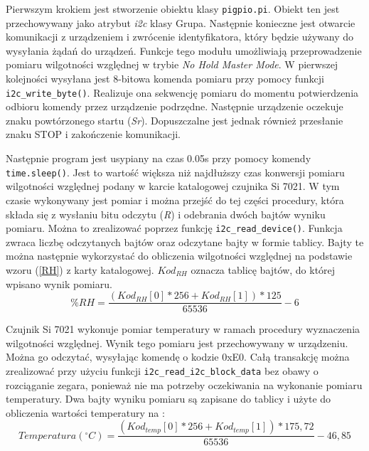 \documentclass[a4paper,11pt,twoside]{article}
\begin{document}
Pierwszym krokiem jest stworzenie obiektu klasy \texttt{pigpio.pi}. Obiekt ten jest przechowywany jako atrybut \textit{i2c} klasy Grupa. Następnie konieczne jest otwarcie komunikacji z urządzeniem i zwrócenie identyfikatora, który będzie używany do wysyłania żądań do urządzeń. Funkcje tego modułu umożliwiają przeprowadzenie pomiaru wilgotności względnej w trybie \textit{No Hold Master Mode}. W pierwszej kolejności wysyłana jest 8-bitowa komenda pomiaru przy pomocy funkcji \texttt{i2c{\_}write{\_}byte()}. Realizuje ona sekwencję pomiaru do momentu potwierdzenia odbioru komendy przez urządzenie podrzędne. Następnie urządzenie oczekuje znaku powtórzonego startu (\textit{Sr}). Dopuszczalne jest jednak również przesłanie znaku STOP i zakończenie komunikacji.

Następnie program jest usypiany na czas 0.05s przy pomocy komendy \texttt{time.sleep()}. Jest to wartość większa niż najdłuższy czas konwersji pomiaru wilgotności względnej podany w karcie katalogowej czujnika Si 7021.\cite{czujnik_temp} W tym czasie wykonywany jest pomiar i można przejść do tej części procedury, która składa się z wysłaniu bitu odczytu (\textit{R}) i odebrania dwóch bajtów wyniku pomiaru. Można to zrealizować poprzez funkcję \texttt{i2c{\_}read{\_}device()}\cite{i2c_read_device}. Funkcja zwraca liczbę odczytanych bajtów oraz odczytane bajty w formie tablicy. Bajty te można następnie wykorzystać do obliczenia wilgotności względnej na podstawie wzoru (\ref{RH}) z karty katalogowej\cite{czujnik_temp}. ${Kod_{RH}}$ oznacza tablicę bajtów, do której wpisano wynik pomiaru.
\begin{equation} \label{RH}
\%RH = \frac{(Kod_{RH}[0] * 256 + Kod_{RH}[1]) * 125}{65536} - 6  
\end{equation}

Czujnik Si 7021 wykonuje pomiar temperatury w ramach procedury wyznaczenia wilgotności względnej. Wynik tego pomiaru jest przechowywany w urządzeniu. Można go odczytać, wysyłając komendę o kodzie 0xE0. Całą transakcję można zrealizować przy użyciu funkcji \texttt{i2c{\_}read{\_}i2c{\_}block{\_}data} bez obawy o rozciąganie zegara, ponieważ nie ma potrzeby oczekiwania na wykonanie pomiaru temperatury. Dwa bajty wyniku pomiaru są zapisane do tablicy i użyte do obliczenia wartości temperatury na \cite{czujnik_temp}:
\begin{equation} \label{Temperatura}
Temperatura ({^\circ}C) = \frac{(Kod_{temp}[0] * 256 + Kod_{temp}[1]) * 175,72}{65536} - 46,85  
\end{equation}
\end{document}
